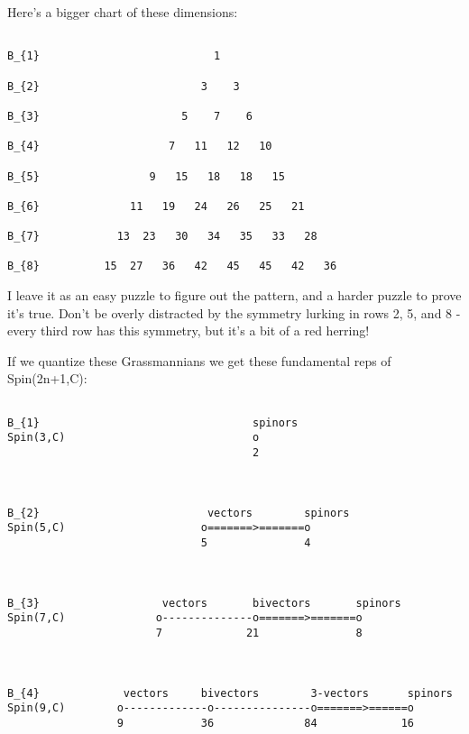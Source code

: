 Here's a bigger chart of these dimensions:



\begin{verbatim}

B_{1}                           1

B_{2}                         3    3
     
B_{3}                      5    7    6
                   
B_{4}                    7   11   12   10

B_{5}                 9   15   18   18   15
                      
B_{6}              11   19   24   26   25   21
 
B_{7}            13  23   30   34   35   33   28

B_{8}          15  27   36   42   45   45   42   36  
\end{verbatim}
    
I leave it as an easy puzzle to figure out the pattern, and a harder
puzzle to prove it's true.  Don't be overly distracted by the symmetry
lurking in rows 2, 5, and 8 - every third row has this symmetry, but
it's a bit of a red herring!

If we quantize these Grassmannians we get these fundamental reps of
Spin(2n+1,C):

                                 

\begin{verbatim}

B_{1}                                 spinors
Spin(3,C)                             o
                                      2

     
                          
B_{2}                          vectors        spinors   
Spin(5,C)                     o=======>=======o
                              5               4


                   
B_{3}                   vectors       bivectors       spinors
Spin(7,C)              o--------------o=======>=======o
                       7             21               8


             
B_{4}             vectors     bivectors        3-vectors      spinors
Spin(9,C)        o-------------o---------------o=======>======o
                 9            36              84             16
\end{verbatim}
    
